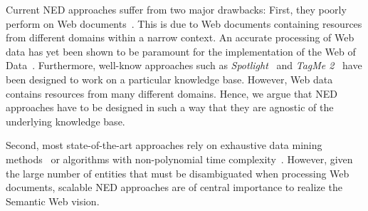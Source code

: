 Current \ac{NED} approaches suffer from two major drawbacks:
First, they poorly perform on Web documents~\cite{RatinovRo09}.
This is due to Web documents containing resources from different domains within a narrow context.
An accurate processing of Web data has yet been shown to be paramount for the implementation of the Web of Data~\cite{GER+13}.
Furthermore, well-know approaches such as \emph{Spotlight}~\cite{spotlight} and \emph{TagMe 2}~\cite{TagMe2} have been designed to work on a particular knowledge base.
However, Web data contains resources from many different domains.
Hence, we argue that \ac{NED} approaches have to be designed in such a way that they are agnostic of the underlying knowledge base.

Second, most state-of-the-art approaches rely on exhaustive data mining methods~\cite{Cucerzan07,rat:rot} or algorithms with non-polynomial time complexity~\cite{Kleb11WIMS}.
However, given the large number of entities that must be disambiguated when processing Web documents, scalable \ac{NED} approaches are of central importance to realize the Semantic Web vision.


